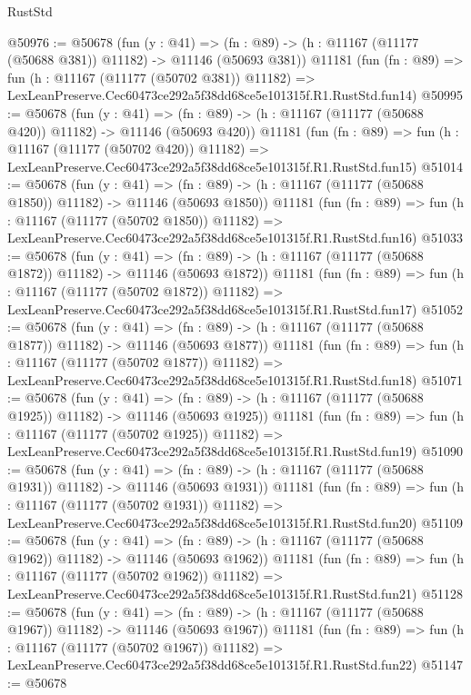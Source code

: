 \begin{lexlean}{RustStd}
\begin{coremodule}
@50976 := @50678
    (fun (y : @41) =>
    (fn : @89) -> (h : @11167 (@11177 (@50688 @381)) @11182) -> @11146 (@50693 @381))
    @11181
    (fun (fn : @89) =>
    fun (h : @11167 (@11177 (@50702 @381)) @11182) =>
    LexLeanPreserve.Cec60473ce292a5f38dd68ce5e101315f.R1.RustStd.fun14)
@50995 := @50678
    (fun (y : @41) =>
    (fn : @89) -> (h : @11167 (@11177 (@50688 @420)) @11182) -> @11146 (@50693 @420))
    @11181
    (fun (fn : @89) =>
    fun (h : @11167 (@11177 (@50702 @420)) @11182) =>
    LexLeanPreserve.Cec60473ce292a5f38dd68ce5e101315f.R1.RustStd.fun15)
@51014 := @50678
    (fun (y : @41) =>
    (fn : @89) -> (h : @11167 (@11177 (@50688 @1850)) @11182) -> @11146 (@50693 @1850))
    @11181
    (fun (fn : @89) =>
    fun (h : @11167 (@11177 (@50702 @1850)) @11182) =>
    LexLeanPreserve.Cec60473ce292a5f38dd68ce5e101315f.R1.RustStd.fun16)
@51033 := @50678
    (fun (y : @41) =>
    (fn : @89) -> (h : @11167 (@11177 (@50688 @1872)) @11182) -> @11146 (@50693 @1872))
    @11181
    (fun (fn : @89) =>
    fun (h : @11167 (@11177 (@50702 @1872)) @11182) =>
    LexLeanPreserve.Cec60473ce292a5f38dd68ce5e101315f.R1.RustStd.fun17)
@51052 := @50678
    (fun (y : @41) =>
    (fn : @89) -> (h : @11167 (@11177 (@50688 @1877)) @11182) -> @11146 (@50693 @1877))
    @11181
    (fun (fn : @89) =>
    fun (h : @11167 (@11177 (@50702 @1877)) @11182) =>
    LexLeanPreserve.Cec60473ce292a5f38dd68ce5e101315f.R1.RustStd.fun18)
@51071 := @50678
    (fun (y : @41) =>
    (fn : @89) -> (h : @11167 (@11177 (@50688 @1925)) @11182) -> @11146 (@50693 @1925))
    @11181
    (fun (fn : @89) =>
    fun (h : @11167 (@11177 (@50702 @1925)) @11182) =>
    LexLeanPreserve.Cec60473ce292a5f38dd68ce5e101315f.R1.RustStd.fun19)
@51090 := @50678
    (fun (y : @41) =>
    (fn : @89) -> (h : @11167 (@11177 (@50688 @1931)) @11182) -> @11146 (@50693 @1931))
    @11181
    (fun (fn : @89) =>
    fun (h : @11167 (@11177 (@50702 @1931)) @11182) =>
    LexLeanPreserve.Cec60473ce292a5f38dd68ce5e101315f.R1.RustStd.fun20)
@51109 := @50678
    (fun (y : @41) =>
    (fn : @89) -> (h : @11167 (@11177 (@50688 @1962)) @11182) -> @11146 (@50693 @1962))
    @11181
    (fun (fn : @89) =>
    fun (h : @11167 (@11177 (@50702 @1962)) @11182) =>
    LexLeanPreserve.Cec60473ce292a5f38dd68ce5e101315f.R1.RustStd.fun21)
@51128 := @50678
    (fun (y : @41) =>
    (fn : @89) -> (h : @11167 (@11177 (@50688 @1967)) @11182) -> @11146 (@50693 @1967))
    @11181
    (fun (fn : @89) =>
    fun (h : @11167 (@11177 (@50702 @1967)) @11182) =>
    LexLeanPreserve.Cec60473ce292a5f38dd68ce5e101315f.R1.RustStd.fun22)
@51147 := @50678

\end{coremodule}
\end{lexlean}
